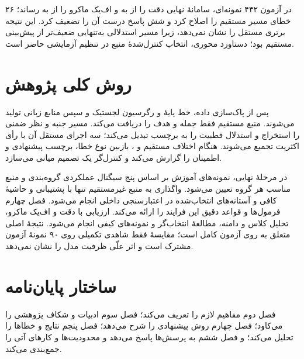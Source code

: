 در آزمون ۴۴۲ نمونه‌ای، سامانۀ نهایی دقت را از  به  و اف‌یک ماکرو را از  به  رساند؛ ۲۶ خطای مسیر مستقیم را اصلاح کرد و شش پاسخ درست آن را تضعیف کرد. این نتیجه برتری مستقل  را نشان نمی‌دهد، زیرا مسیر استدلالی به‌تنهایی ضعیف‌تر از پیش‌بینی مستقیم بود؛ دستاورد محوری، انتخاب کنترل‌شدۀ منبع در تنظیم آزمایشی حاضر است.

\section{روش کلی پژوهش}

پس از پاک‌سازی داده، خط پایۀ  و رگرسیون لجستیک و سپس منابع زبانی تولید می‌شوند. منبع مستقیم فقط جمله و هدف را دریافت می‌کند. مسیر  جنبه و نظر ضمنی را استخراج و استدلال قطبیت را به برچسب تبدیل می‌کند؛ سه اجرای مستقل آن با رأی اکثریت تجمیع می‌شوند. هنگام اختلاف مستقیم و ، بازبین نوع خطا، برچسب پیشنهادی و اطمینان را گزارش می‌کند و کنترل‌گر یک تصمیم میانی می‌سازد.

در مرحلۀ نهایی، نمونه‌های آموزش بر اساس پنج سیگنال عملکردی گروه‌بندی و منبع مناسب هر گروه تعیین می‌شود. واگذاری به منبع غیرمستقیم تنها با پشتیبانی و حاشیۀ کافی و آستانه‌های انتخاب‌شده در اعتبارسنجی داخلی انجام می‌شود. فصل چهارم فرمول‌ها و قواعد دقیق این فرایند را ارائه می‌کند. ارزیابی با دقت و اف‌یک ماکرو، تحلیل کلاس و دامنه، مطالعۀ انتخاب‌گر و نمونه‌های کیفی انجام می‌شود. نتیجۀ اصلی متعلق به  روی آزمون کامل است؛ مقایسۀ  فقط شاهدی تکمیلی روی ۹۰ نمونۀ آزمون مشترک است و اثر علّی ظرفیت مدل را نشان نمی‌دهد.

\section{ساختار پایان‌نامه}

فصل دوم مفاهیم لازم را تعریف می‌کند؛ فصل سوم ادبیات و شکاف پژوهشی را می‌کاود؛ فصل چهارم روش پیشنهادی را شرح می‌دهد؛ فصل پنجم نتایج و خطاها را تحلیل می‌کند؛ و فصل ششم به پرسش‌ها پاسخ می‌دهد و محدودیت‌ها و کارهای آتی را جمع‌بندی می‌کند.
